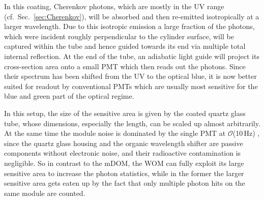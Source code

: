 In this coating, Cherenkov photons, which are mostly in the UV range (cf.\
Sec.~\ref{sec:Cherenkov}), will be absorbed and then re-emitted isotropically
at a larger wavelength. Due to this isotropic emission a large fraction of the
photons, which were incident roughly perpendicular to the cylinder surface,
will be captured within the tube and hence guided towards its end via multiple
total internal reflection. At the end of the tube, an adiabatic light guide
will project its cross-section area onto a small PMT which then reads out the
photons. Since their spectrum has been shifted from the UV to the optical blue,
it is now better suited for readout by conventional PMTs which are usually most
sensitive for the blue and green part of the optical regime.

In this setup, the size of the sensitive area is given by the coated quartz
glass tube, whose dimensions, especially the length, can be scaled up almost
arbitrarily. At the same time the module noise is dominated by the single PMT
at $\mathcal{O}$(10\,Hz) \cite{WOM_ICRC}, since the quartz glass housing and the
organic wavelength shifter are passive components without electronic noise, and
their radioactive contamination is negligible. So in contrast to the mDOM, the
WOM can fully exploit its large sensitive area to increase the photon
statistics, while in the former the larger sensitive area gets eaten up by the
fact that only multiple photon hits on the same module are counted.